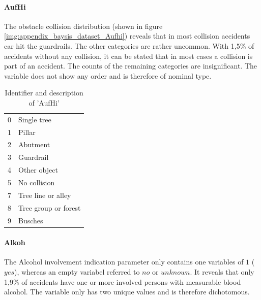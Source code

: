\documentclass[a4paper,headsepline,footsepline,fontsize=11pt,BCOR=12mm,DIV=12]{report}
\begin{document}
\paragraph{AufHi}
The obstacle collision distribution (shown in figure \ref{img:appendix_baysis_dataset_Aufhi}) reveals that in most collision accidents car hit the guardrails. The other categories are rather uncommon. With 1,5\% of accidents without any collision, it can be stated that in most cases a collision is part of an accident. The counts of the remaining categories are insignificant. The variable does not show any order and is therefore of nominal type.
\noindent
\begin{table}[h!]
	\centering
	\begin{tabular}{c|l}  
		0 & Single tree \\
		1 & Pillar \\
		2 & Abutment \\
		3 & Guardrail \\
		4 & Other object \\
		5 & No collision \\
		7 & Tree line or alley \\
		8 & Tree group or forest \\
		9 & Busches \\
	\end{tabular}
	\caption{Identifier and description of 'AufHi'}
	\label{table:baysis_dataset_AufHi}
\end{table}

\paragraph{Alkoh}
The Alcohol involvement indication parameter only contains one variables of $1$ ($yes$), whereas an empty variabel referred to $no$ or $unknown$. It reveals that only 1,9\% of accidents have one or more involved persons with measurable blood alcohol. The variable only has two unique values and is therefore dichotomous.
\end{document}
